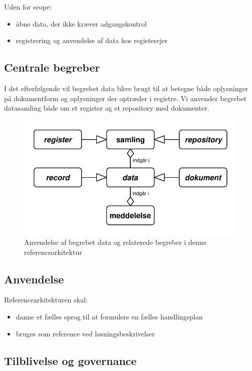 Uden for scope:

\begin{itemize}
\tightlist
\item
  åbne data, der ikke kræver adgangskontrol
\item
  registrering og anvendelse af data hos registerejer
\end{itemize}

\subsection{Centrale begreber}\label{centrale-begreber}

I det efterfølgende vil begrebet data blive brugt til at betegne både
oplysninger på dokumentform og oplysninger der optræder i registre. Vi
anvender begrebet datasamling både om et register og et repository med
dokumenter.

\begin{figure}
\centering
\includegraphics{abstraktion.pdf}
\caption{Anvendelse af begrebet data og relaterede begreber i denne
referencearkitektur}
\end{figure}

\subsection{Anvendelse}\label{anvendelse}

Referencearkitekturen skal:

\begin{itemize}
\tightlist
\item
  danne et fælles sprog til at formulere en fælles handlingsplan
\item
  bruges som reference ved løsningsbeskrivelser
\end{itemize}

\subsection{Tilblivelse og governance}\label{tilblivelse-og-governance}


